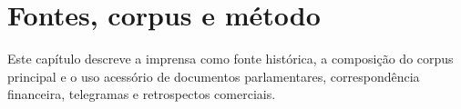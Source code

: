 \chapter{Fontes, corpus e método}

Este capítulo descreve a imprensa como fonte histórica, a composição do corpus principal e o uso acessório de documentos parlamentares, correspondência financeira, telegramas e retrospectos comerciais.


